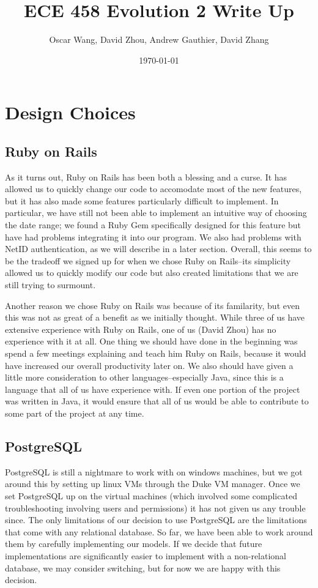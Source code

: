 \documentclass{article}
\author{Oscar Wang, David Zhou, Andrew Gauthier, David Zhang}
\date{\today}
\title{ECE 458 Evolution 2 Write Up}
\begin{document}
\maketitle
\section{Design Choices}
\subsection{Ruby on Rails}
As it turns out, Ruby on Rails has been both a blessing and a curse.  It has allowed us to quickly change our code to accomodate most of the new features, but it has also made some features particularly difficult to implement.  In particular, we have still not been able to implement an intuitive way of choosing the date range; we found a Ruby Gem specifically designed for this feature but have had problems integrating it into our program.  We also had problems with NetID authentication, as we will describe in a later section.  Overall, this seems to be the tradeoff we signed up for when we chose Ruby on Rails--its simplicity allowed us to quickly modify our code but also created limitations that we are still trying to surmount.\par
Another reason we chose Ruby on Rails was because of its familarity, but even this was not as great of a benefit as we initially thought.  While three of us have extensive experience with Ruby on Rails, one of us (David Zhou) has no experience with it at all.  One thing we should have done in the beginning was spend a few meetings explaining and teach him Ruby on Rails, because it would have increased our overall productivity later on.  We also should have given a little more consideration to other languages--especially Java, since this is a language that all of us have experience with.  If even one portion of the project was written in Java, it would ensure that all of us would be able to contribute to some part of the project at any time.
\subsection{PostgreSQL}
PostgreSQL is still a nightmare to work with on windows machines, but we got around this by setting up linux VMs through the Duke VM manager.  Once we set PostgreSQL up on the virtual machines (which involved some complicated troubleshooting involving users and permissions) it has not given us any trouble since.  The only limitations of our decision to use PostgreSQL are the limitations that come with any relational database.  So far, we have been able to work around them by carefully implementing our models.  If we decide that future implementations are significantly easier to implement with a non-relational database, we may consider switching, but for now we are happy with this decision.
\end{document}
